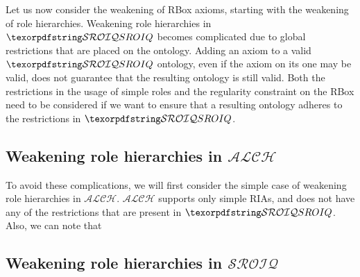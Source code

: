 Let us now consider the weakening of RBox axioms, starting with the weakening of role hierarchies. Weakening role hierarchies in $\SROIQ$ becomes complicated due to global restrictions that are placed on the ontology. Adding an axiom to a valid $\SROIQ$ ontology, even if the axiom on its one may be valid, does not guarantee that the resulting ontology is still valid. Both the restrictions in the usage of simple roles and the regularity constraint on the RBox need to be considered if we want to ensure that a resulting ontology adheres to the restrictions in $\SROIQ$.

\subsection{Weakening role hierarchies in $\mathcal{ALCH}$} \label{weakening-rbox-alch}

To avoid these complications, we will first consider the simple case of weakening role hierarchies in $\mathcal{ALCH}$. $\mathcal{ALCH}$ supports only simple RIAs, and does not have any of the restrictions that are present in $\SROIQ$. Also, we can note that

\begin{example}
\end{example}

\subsection{Weakening role hierarchies in $\mathcal{SROIQ}$} \label{weakening-rbox-sroiq}

\begin{example}
\end{example}

\begin{example}
\end{example}

\begin{example}
\end{example}

